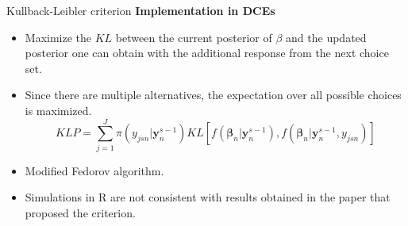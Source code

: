 \documentclass[11pt,t]{beamer}
\begin{document}
\begin{frame}[fragile]{Kullback-Leibler criterion}
\textbf{Implementation in DCEs}
\begin{itemize}
	\item Maximize the $KL$ between the current	posterior of $\beta$ and the updated posterior one can obtain with the additional response from the next choice set.
	\item Since there are multiple alternatives, the expectation over all possible choices is maximized.
	\vspace*{-2mm}
	$$KLP = \sum_{j=1}^J \pi (y_{jsn}|\mathbf{y}_n^{s-1}) KL\left[f(\pmb{\beta}_n|\mathbf{y}_n^{s-1}), f(\pmb{\beta}_n|\mathbf{y}_n^{s-1},y_{jsn})\right]$$
	\item Modified Fedorov algorithm. 
	\item Simulations in R are not consistent with results obtained in the paper that proposed the criterion.
\end{itemize}
\end{frame}

\end{document}
